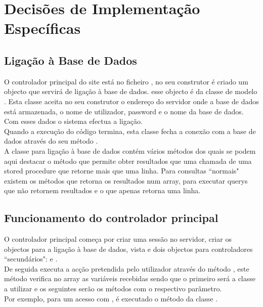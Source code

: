 \section{Decisões de Implementação Específicas}
\subsection{Ligação à Base de Dados}
O controlador principal do site está no ficheiro , no seu construtor é criado um objecto que servirá de ligação à base de dados. esse objecto é da classe de modelo . Esta classe aceita no seu construtor o endereço do servidor onde a base de dados está armazenada, o nome de utilizador, password e o nome da base de dados. Com esses dados o sistema efectua a ligação.\\
Quando a execução do código termina, esta classe fecha a conexão com a base de dados através do seu método .\\
A classe para ligação à base de dados contém vários métodos dos quais se podem aqui destacar o método  que permite obter resultados que uma chamada de uma stored procedure que retorne mais que uma linha. Para consultas ``normais" existem os métodos  que retorna os resultados num array,  para executar querys que não retornem resultados e o  que apenas retorna uma linha.

\subsection{Funcionamento do controlador principal}
O controlador principal  começa por criar uma sessão  no servidor, criar os objectos para a ligação à base de dados, vista e dois objectos para controladores ``secundários":  e .\\
De seguida executa a acção pretendida pelo utilizador através do método , este método verifica no array  as variáveis recebidas sendo que o primeiro será a classe a utilizar e os seguintes serão os métodos com o respectivo parâmetro.\\
Por exemplo, para um acesso com , é executado o método  da classe .

